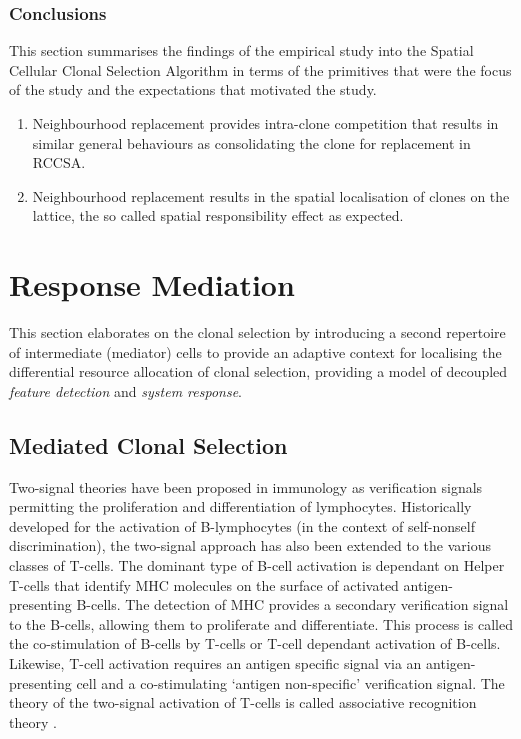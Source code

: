 %
%
\subsubsection{Conclusions}
This section summarises the findings of the empirical study into the Spatial Cellular Clonal Selection Algorithm in terms of the primitives that were the focus of the study and the expectations that motivated the study.

\begin{enumerate}
	\item Neighbourhood replacement provides intra-clone competition that results in similar general behaviours as consolidating the clone for replacement in RCCSA.
	\item Neighbourhood replacement results in the spatial localisation of clones on the lattice, the so called spatial responsibility effect as expected.
\end{enumerate}

%
%
\section{Response Mediation}
\label{sec:cells:mediated}
This section elaborates on the clonal selection by introducing a second repertoire of intermediate (mediator) cells to provide an adaptive context for localising the differential resource allocation of clonal selection, providing a model of decoupled \emph{feature detection} and \emph{system response}. 

%
%
\subsection{Mediated Clonal Selection}
Two-signal theories have been proposed in immunology as verification signals permitting the proliferation and differentiation of lymphocytes. Historically developed for the activation of B-lymphocytes (in the context of self-nonself discrimination), the two-signal approach has also been extended to the various classes of T-cells. The dominant type of B-cell activation is dependant on Helper T-cells that identify MHC molecules on the surface of activated antigen-presenting B-cells. The detection of MHC provides a secondary verification signal to the B-cells, allowing them to proliferate and differentiate. This process is called the co-stimulation of B-cells by T-cells or T-cell dependant activation of B-cells. Likewise, T-cell activation requires an antigen specific signal via an antigen-presenting cell and a co-stimulating `antigen non-specific' verification signal. The theory of the two-signal activation of T-cells is called associative recognition theory \cite{Bretscher1970}.

